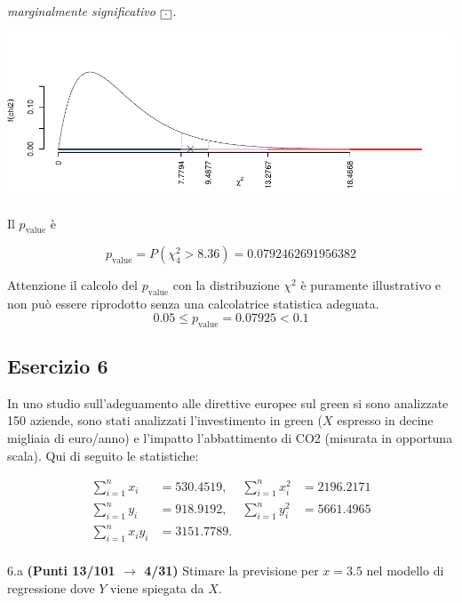 \documentclass[
  11pt,
]{book}
\theoremstyle{mytheoremstyle}
\theoremstyle{mydefstyle}
\newenvironment{sol}
  {
  \begin{tcolorbox}[enhanced,breakable,arc=0.1mm,boxrule=1pt,colback=white,colframe=iblue,
  title=\bf \fontfamily{lmss}\selectfont \hspace{.5 cm} Soluzione,drop fuzzy shadow]

}{
\end{tcolorbox}
  }
\begin{document}
\begin{sol}
\emph{marginalmente significativo} \(\fbox{.}\).

\begin{center}\includegraphics{Esami_passati_con_soluzioni_files/figure-latex/2023-139-1} \end{center}

Il \(p_{\text{value}}\) è

\[ p_{\text{value}} = P(\chi^2_{4}>8.36)=0.0792462691956382 \]

Attenzione il calcolo del \(p_\text{value}\) con la distribuzione \(\chi^2\) è puramente illustrativo e non può essere riprodotto senza una calcolatrice statistica adeguata.\[
 0.05 \leq p_\text{value}= 0.07925 < 0.1 
\]

\end{sol}

\subsection{Esercizio 6}\label{esercizio-6-20}

In uno studio sull'adeguamento alle direttive europee sul green si sono analizzate 150 aziende, sono stati analizzati l'investimento in green (\(X\) espresso in decine migliaia di euro/anno) e l'impatto l'abbattimento di CO2 (misurata in opportuna scala). Qui di seguito le statistiche:

\begin{align*}
\sum_{i=1}^n x_i &= 530.4519,   &\sum_{i=1}^n x_i^2 &= 2196.2171 \\
\sum_{i=1}^n y_i &= 918.9192,   &\sum_{i=1}^n y_i^2 &= 5661.4965 \\
\sum_{i=1}^n x_iy_i &= 3151.7789.    \\
\end{align*}

6.a \textbf{(Punti 13/101 \(\rightarrow\) 4/31)} Stimare la previsione per \(x=3.5\) nel modello di regressione dove \(Y\) viene spiegata da \(X\).
\end{document}

